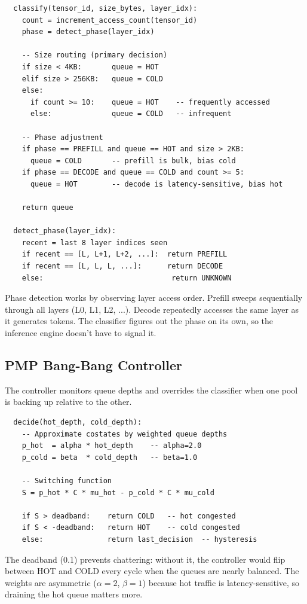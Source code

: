 \documentclass[11pt]{article}
\begin{document}
\begin{verbatim}
  classify(tensor_id, size_bytes, layer_idx):
    count = increment_access_count(tensor_id)
    phase = detect_phase(layer_idx)

    -- Size routing (primary decision)
    if size < 4KB:       queue = HOT
    elif size > 256KB:   queue = COLD
    else:
      if count >= 10:    queue = HOT    -- frequently accessed
      else:              queue = COLD   -- infrequent

    -- Phase adjustment
    if phase == PREFILL and queue == HOT and size > 2KB:
      queue = COLD       -- prefill is bulk, bias cold
    if phase == DECODE and queue == COLD and count >= 5:
      queue = HOT        -- decode is latency-sensitive, bias hot

    return queue

  detect_phase(layer_idx):
    recent = last 8 layer indices seen
    if recent == [L, L+1, L+2, ...]:  return PREFILL
    if recent == [L, L, L, ...]:      return DECODE
    else:                              return UNKNOWN
\end{verbatim}

Phase detection works by observing layer access order. Prefill sweeps sequentially through all layers (L0, L1, L2, ...). Decode repeatedly accesses the same layer as it generates tokens. The classifier figures out the phase on its own, so the inference engine doesn't have to signal it.

\subsection{PMP Bang-Bang Controller}

The controller monitors queue depths and overrides the classifier when one pool is backing up relative to the other.

\begin{verbatim}
  decide(hot_depth, cold_depth):
    -- Approximate costates by weighted queue depths
    p_hot  = alpha * hot_depth    -- alpha=2.0
    p_cold = beta  * cold_depth   -- beta=1.0

    -- Switching function
    S = p_hot * C * mu_hot - p_cold * C * mu_cold

    if S > deadband:    return COLD   -- hot congested
    if S < -deadband:   return HOT    -- cold congested
    else:               return last_decision  -- hysteresis
\end{verbatim}

The deadband (0.1) prevents chattering: without it, the controller would flip between HOT and COLD every cycle when the queues are nearly balanced. The weights are asymmetric ($\alpha{=}2$, $\beta{=}1$) because hot traffic is latency-sensitive, so draining the hot queue matters more.
\end{document}
